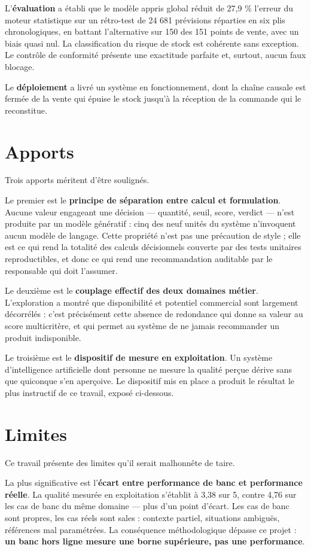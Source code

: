 L'\textbf{évaluation} a établi que le modèle appris global réduit de 27,9 \% l'erreur du moteur statistique sur un rétro-test de 24 681 prévisions réparties en six plis chronologiques, en battant l'alternative sur 150 des 151 points de vente, avec un biais quasi nul. La classification du risque de stock est cohérente sans exception. Le contrôle de conformité présente une exactitude parfaite et, surtout, aucun faux blocage.

Le \textbf{déploiement} a livré un système en fonctionnement, dont la chaîne causale est fermée de la vente qui épuise le stock jusqu'à la réception de la commande qui le reconstitue.

\section*{Apports}

Trois apports méritent d'être soulignés.

Le premier est le \textbf{principe de séparation entre calcul et formulation}. Aucune valeur engageant une décision — quantité, seuil, score, verdict — n'est produite par un modèle génératif : cinq des neuf unités du système n'invoquent aucun modèle de langage. Cette propriété n'est pas une précaution de style ; elle est ce qui rend la totalité des calculs décisionnels couverte par des tests unitaires reproductibles, et donc ce qui rend une recommandation auditable par le responsable qui doit l'assumer.

Le deuxième est le \textbf{couplage effectif des deux domaines métier}. L'exploration a montré que disponibilité et potentiel commercial sont largement décorrélés : c'est précisément cette absence de redondance qui donne sa valeur au score multicritère, et qui permet au système de ne jamais recommander un produit indisponible.

Le troisième est le \textbf{dispositif de mesure en exploitation}. Un système d'intelligence artificielle dont personne ne mesure la qualité perçue dérive sans que quiconque s'en aperçoive. Le dispositif mis en place a produit le résultat le plus instructif de ce travail, exposé ci-dessous.

\section*{Limites}

Ce travail présente des limites qu'il serait malhonnête de taire.

La plus significative est l'\textbf{écart entre performance de banc et performance réelle}. La qualité mesurée en exploitation s'établit à 3,38 sur 5, contre 4,76 sur les cas de banc du même domaine — plus d'un point d'écart. Les cas de banc sont propres, les cas réels sont sales : contexte partiel, situations ambiguës, références mal paramétrées. La conséquence méthodologique dépasse ce projet : \textbf{un banc hors ligne mesure une borne supérieure, pas une performance}.

